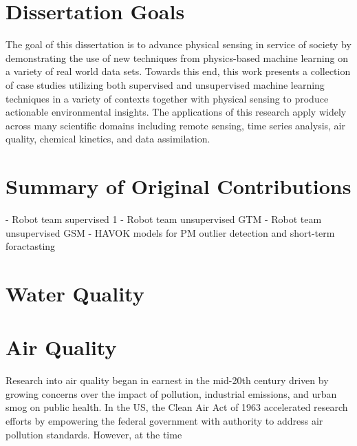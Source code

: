

\section{Dissertation Goals}


The goal of this dissertation is to advance physical sensing in service of society by demonstrating the use of new techniques from physics-based machine learning on a variety of real world data sets. Towards this end, this work presents a collection of case studies utilizing both supervised and unsupervised machine learning techniques in a variety of contexts together with physical sensing to produce actionable environmental insights. The applications of this research apply widely across many scientific domains including remote sensing, time series analysis, air quality, chemical kinetics, and data assimilation.




\section{Summary of Original Contributions}

- Robot team supervised 1
- Robot team unsupervised GTM
- Robot team unsupervised GSM
- HAVOK models for PM outlier detection and short-term foractasting









\section{Water Quality}
\section{Air Quality}

Research into air quality began in
earnest in the mid-20th century driven by growing concerns over the impact of
pollution, industrial emissions, and urban smog on public health. In the US, the
Clean Air Act of 1963 accelerated research efforts by empowering the federal
government with authority to address air pollution standards. However, at the
time  


